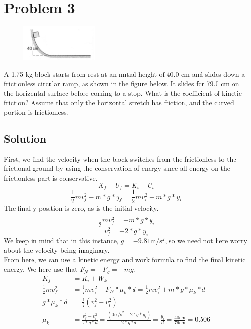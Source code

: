\documentclass[12pt]{article}
\begin{document}

\pagebreak
\section*{Problem 3}
\begin{figure}
    \vspace{-30pt}
    \includegraphics[width=0.35\textwidth]{graph_3.png} 
\end{figure}
A 1.75-kg block starts from rest at an initial height of 40.0 cm and slides down a frictionless circular ramp, as shown in the figure below. It slides for 79.0 cm on the horizontal surface before coming to a stop. What is the coefficient of kinetic friction? Assume that only the horizontal stretch has friction, and the curved portion is frictionless.

\subsection*{Solution}
First, we find the velocity when the block switches from the frictionless to the frictional ground by using the conservation of energy since all energy on the frictionless part is conservative.
\[ K_f - U_f = K_i - U_i \]
\[ \frac{1}{2}mv_f^2 - m*g*y_f = \frac{1}{2}mv_i^2 - m*g*y_i \]
The final y-position is zero, as is the initial velocity.
\[ \frac{1}{2}mv_f^2 = -m*g*y_i \]
\[ v_f^2 = -2*g*y_i \]
We keep in mind that in this instance, $ g = -9.81\unit{\meter/\second^2} $, so we need not here worry about the velocity being imaginary.\\
From here, we can use a kinetic energy and work formula to find the final kinetic energy. We here use that $F_N = -F_g = -mg$.
\begin{align*}
    K_f &=  K_i + W_k\\
    \frac{1}{2}mv_f^2   &=  \frac{1}{2}mv_i^2 - F_N * \mu_k * d
        =   \frac{1}{2}mv_i^2 + m * g * \mu_k * d\\
    g * \mu_k * d   &= \frac{1}{2}(v_f^2 - v_i^2)\\
    \mu_k   &=  \frac{v_f^2 - v_i^2}{2*g*d}
            =   \frac{(0\unit{\meter/\second}^2 + 2*g*y_i)}{2*g*d}
            =   \frac{y_i}{d} = \frac{40\unit{\centi\meter}}{79\unit{\centi\meter}}
            =   \boxed{0.506}
\end{align*}
\end{document}

